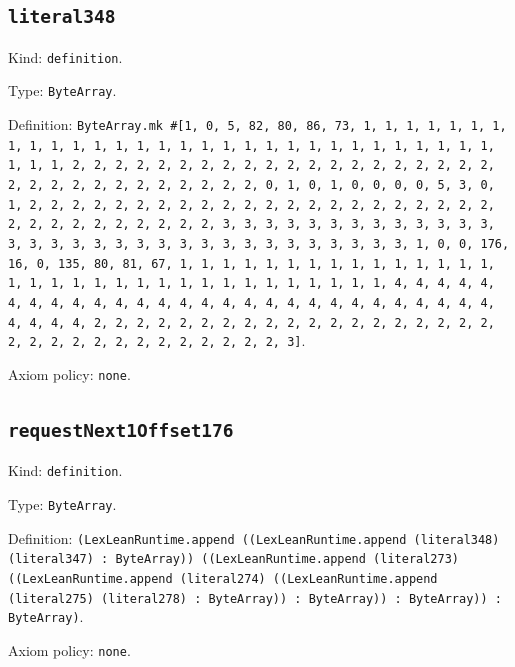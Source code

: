\documentclass[11pt]{article}
\begin{document}
\subsection*{\texttt{literal348}}
\noindent Kind: \texttt{definition}.\par
\noindent Type: \texttt{ByteArray}.\par
\noindent Definition: \texttt{ByteArray.mk \#[1, 0, 5, 82, 80, 86, 73, 1, 1, 1, 1, 1, 1, 1, 1, 1, 1, 1, 1, 1, 1, 1, 1, 1, 1, 1, 1, 1, 1, 1, 1, 1, 1, 1, 1, 1, 1, 1, 1, 1, 2, 2, 2, 2, 2, 2, 2, 2, 2, 2, 2, 2, 2, 2, 2, 2, 2, 2, 2, 2, 2, 2, 2, 2, 2, 2, 2, 2, 2, 2, 2, 2, 0, 1, 0, 1, 0, 0, 0, 0, 5, 3, 0, 1, 2, 2, 2, 2, 2, 2, 2, 2, 2, 2, 2, 2, 2, 2, 2, 2, 2, 2, 2, 2, 2, 2, 2, 2, 2, 2, 2, 2, 2, 2, 2, 2, 3, 3, 3, 3, 3, 3, 3, 3, 3, 3, 3, 3, 3, 3, 3, 3, 3, 3, 3, 3, 3, 3, 3, 3, 3, 3, 3, 3, 3, 3, 3, 3, 1, 0, 0, 176, 16, 0, 135, 80, 81, 67, 1, 1, 1, 1, 1, 1, 1, 1, 1, 1, 1, 1, 1, 1, 1, 1, 1, 1, 1, 1, 1, 1, 1, 1, 1, 1, 1, 1, 1, 1, 1, 1, 1, 4, 4, 4, 4, 4, 4, 4, 4, 4, 4, 4, 4, 4, 4, 4, 4, 4, 4, 4, 4, 4, 4, 4, 4, 4, 4, 4, 4, 4, 4, 4, 4, 2, 2, 2, 2, 2, 2, 2, 2, 2, 2, 2, 2, 2, 2, 2, 2, 2, 2, 2, 2, 2, 2, 2, 2, 2, 2, 2, 2, 2, 2, 2, 2, 3]}.\par
\noindent Axiom policy: \texttt{none}.\par
\subsection*{\texttt{requestNext1Offset176}}
\noindent Kind: \texttt{definition}.\par
\noindent Type: \texttt{ByteArray}.\par
\noindent Definition: \texttt{(LexLeanRuntime.append ((LexLeanRuntime.append (literal348) (literal347) : ByteArray)) ((LexLeanRuntime.append (literal273) ((LexLeanRuntime.append (literal274) ((LexLeanRuntime.append (literal275) (literal278) : ByteArray)) : ByteArray)) : ByteArray)) : ByteArray)}.\par
\noindent Axiom policy: \texttt{none}.\par
\end{document}
